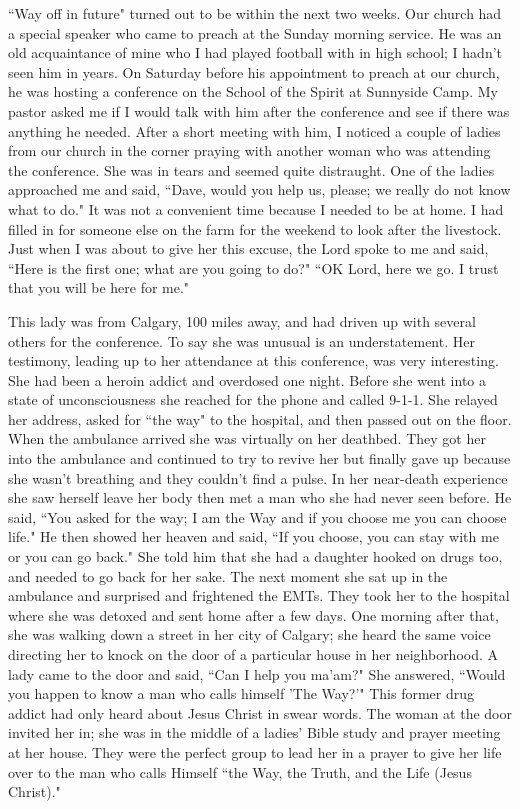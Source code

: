 \documentclass[oneside]{book}
\begin{document}
``Way off in future" turned out to be within the next two weeks. Our church had a special speaker who came to preach at the Sunday morning service. He was an old acquaintance of mine who I had played football with in high school; I hadn't seen him in years. On Saturday before his appointment to preach at our church, he was hosting a conference on the School of the Spirit at Sunnyside Camp. My pastor asked me if I would talk with him after the conference and see if there was anything he needed. After a short meeting with him, I noticed a couple of ladies from our church in the corner praying with another woman who was attending the conference. She  was in tears and seemed quite distraught. One of the ladies approached me and said, ``Dave, would you help us, please; we really do not know what to do." It was not a convenient time because I needed to be at home. I had filled in for someone else on the farm for the weekend to look after the livestock. Just when I was about to give her this excuse, the Lord spoke to me and said, ``Here is the first one; what are you going to do?" ``OK Lord, here we go. I trust that you will be here for me." 


This lady was from Calgary, 100 miles away, and had driven up with several others for the conference. To say she was unusual is an understatement. Her testimony, leading up to her attendance at this conference, was very interesting. She had been a heroin addict and overdosed one night. Before she went into a state of unconsciousness she reached for the phone and called 9-1-1. She relayed her address, asked for ``the way" to the hospital, and then passed out on the floor. When the ambulance arrived she was virtually on her deathbed. They got her into the ambulance and continued to try to revive her but finally gave up because she wasn't breathing and they couldn't find a pulse. In her near-death experience she saw herself leave her body then met a man who she had never seen before. He said, ``You asked for the way; I am the Way and if you choose me you can choose life."  He then showed her heaven and said, ``If you choose, you can stay with me or you can go back." She told him that she had a daughter hooked on drugs too, and needed to go back for her sake. The next moment she sat up in the ambulance and surprised and frightened the EMTs. They took her to the hospital where she was detoxed and sent home after a few days. One morning after that, she was walking down a street in her city of Calgary; she heard the same voice directing her to knock on the door of a particular house in her neighborhood. A lady came to the door and said, ``Can I help you ma'am?" She answered, ``Would you happen to know a man who calls himself 'The Way?'" This former drug addict had only heard about Jesus Christ in swear words. The woman at the door invited her in; she was in the middle of a ladies' Bible study and prayer meeting at her house. They were the perfect group to lead her in a prayer to give her life over to the man who calls Himself ``the Way, the Truth, and the Life (Jesus Christ)."
\end{document}
